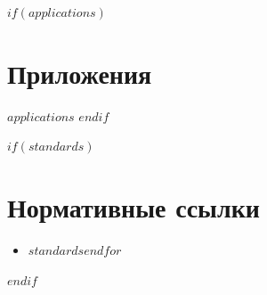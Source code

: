 \documentclass[14pt,a4paper]{extarticle}
\begin{document}
$if(applications)$
\newpage
\appendix
\section*{Приложения}
$applications$
$endif$

$if(standards)$
\newpage
\section*{Нормативные ссылки}
\begin{itemize}
$for(standards)$\item $standards$$endfor$
\end{itemize}
$endif$
\end{document}
